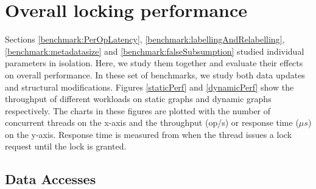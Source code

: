 

\section{Overall locking performance}
Sections \ref{benchmark:PerOpLatency}, \ref{benchmark:labellingAndRelabelling}, \ref{benchmark:metadatasize} and \ref{benchmark:falseSubsumption} studied individual parameters in isolation. Here, we study them together and evaluate their effects on overall performance. 
In these set of benchmarks, we study both data updates and structural modifications. 
Figures \ref{staticPerf} and \ref{dynamicPerf} show the throughput of different workloads on static graphs and dynamic graphs respectively. 
The charts in these figures are plotted with the number of concurrent threads on the x-axis and the throughput (op/s) or response time ($\mu s$) on the y-axis. 
Response time is measured from when the thread issues a lock request until the lock is granted.


\subsection{Data Accesses} \label{benchmark:StaticOverallPerf}


